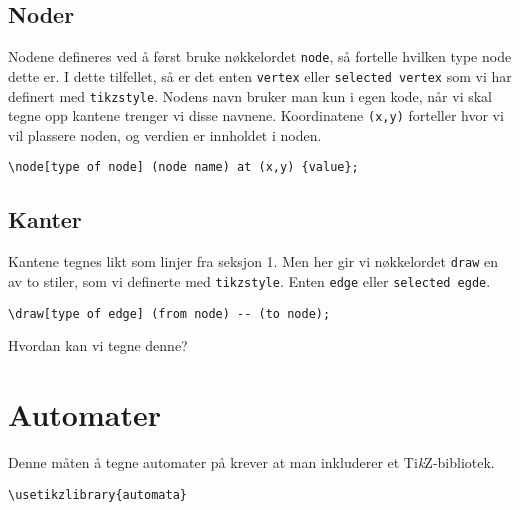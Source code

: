 \documentclass[11pt, a4paper]{article}
\newcommand{\TikZ}{Ti\textit{k}Z\xspace}
\newcommand\Oppgave{\reversemarginpar\marginnote {\textcolor{orange}{Utfordring}}}
\begin{document}
\subsection{Noder} 
Nodene defineres ved å først bruke nøkkelordet \texttt{node}, så fortelle hvilken type node dette er. I dette tilfellet, så er det enten \texttt{vertex} eller \texttt{selected vertex} som vi har definert med \texttt{tikzstyle}. Nodens navn bruker man kun i egen kode, når vi skal tegne opp kantene trenger vi disse navnene. Koordinatene \texttt{(x,y)} forteller hvor vi vil plassere noden, og verdien er innholdet i noden.
\begin{Verbatim}[fontsize=\small]
\node[type of node] (node name) at (x,y) {value};
\end{Verbatim}

\subsection{Kanter}
Kantene tegnes likt som linjer fra seksjon 1. Men her gir vi nøkkelordet \texttt{draw} en av to stiler, som vi definerte med \texttt{tikzstyle}. Enten \texttt{edge} eller \texttt{selected egde}.

\begin{Verbatim}[fontsize=\small]
\draw[type of edge] (from node) -- (to node);
\end{Verbatim}

\Oppgave
\noindent Hvordan kan vi tegne denne?
\begin{center}
\end{center}

\newpage

\section{Automater}
Denne måten å tegne automater på krever at man inkluderer et \TikZ-bibliotek.
\begin{Verbatim}[fontsize=\small]
\usetikzlibrary{automata}
\end{Verbatim}

\begin{center}
\end{center}
\end{document}
